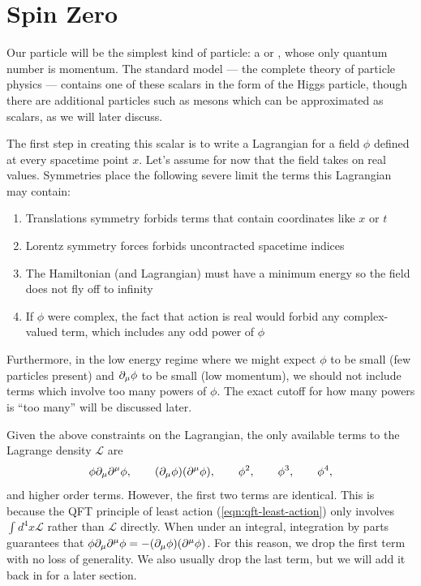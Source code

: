 \chapter{Spin Zero}
\label{chap:spin-zero}

Our particle will be the simplest kind of particle: a  or , whose only quantum number is momentum. The standard model --- the complete theory of particle physics --- contains one of these scalars in the form of the Higgs particle, though there are additional particles such as mesons which can be approximated as scalars, as we will later discuss.

The first step in creating this scalar is to write a Lagrangian for a field $\phi$ defined at every spacetime point $x$. Let's assume for now that the field takes on real values. Symmetries place the following severe limit the terms this Lagrangian may contain:
\begin{enumerate}
  \item Translations symmetry forbids terms that contain coordinates like $x$ or $t$
  \item Lorentz symmetry forces forbids uncontracted spacetime indices
  \item The Hamiltonian (and Lagrangian) must have a minimum energy so the field does not fly off to infinity
  \item If $\phi$ were complex, the fact that action is real would forbid any complex-valued term, which includes any odd power of $\phi$ 
\end{enumerate}

Furthermore, in the low energy regime where we might expect $\phi$ to be small (few particles present) and $\partial_\mu \phi$ to be small (low momentum), we should not include terms which involve too many powers of $\phi$. The exact cutoff for how many powers is ``too many'' will be discussed later.

Given the above constraints on the Lagrangian, the only available terms to the Lagrange density $\mathcal{L}$ are
$$\phi\partial_\mu \partial^\mu \phi,\qquad
(\partial_\mu \phi)(\partial^\mu \phi),\qquad
\phi^2,\qquad\phi^3,\qquad
\phi^4,$$
and higher order terms. However, the first two terms are identical. This is because the QFT principle of least action (\ref{eqn:qft-least-action}) only involves $\int d^4 x\mathcal{L}$ rather than $\mathcal{L}$ directly. When under an integral, integration by parts guarantees that $\phi\partial_\mu \partial^\mu \phi=-(\partial_\mu \phi)(\partial^\mu \phi)$. For this reason, we drop the first term with no loss of generality. We also usually drop the last term, but we will add it back in for a later section.

